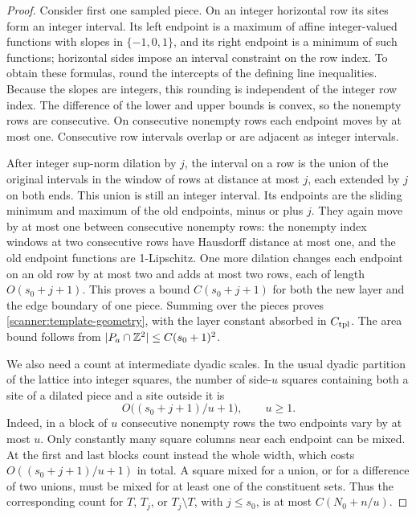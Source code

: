 \begin{proof}
Consider first one sampled piece.  On an integer horizontal row its sites
form an integer interval.  Its left endpoint is a maximum of affine
integer-valued functions with slopes in \(\{-1,0,1\}\), and its right
endpoint is a minimum of such functions; horizontal sides impose an
interval constraint on the row index.  To obtain these formulas, round
the intercepts of the defining line inequalities.  Because the slopes
are integers, this rounding is independent of the integer row index.
The difference of the lower and upper bounds is convex, so the nonempty
rows are consecutive.  On consecutive nonempty rows each endpoint moves
by at most one.  Consecutive row intervals overlap or are adjacent as
integer intervals.

After integer sup-norm dilation by \(j\), the interval on a row is the
union of the original intervals in the window of rows at distance at
most \(j\), each extended by \(j\) on both ends.  This union is still
an integer interval.  Its endpoints are the sliding minimum and maximum
of the old endpoints, minus or plus \(j\).  They again move by at most
one between consecutive nonempty rows: the nonempty index windows at
two consecutive rows have Hausdorff distance at most one, and the old
endpoint functions are 1-Lipschitz.  One more dilation changes each
endpoint on an old row by at most two and adds at most two rows, each
of length \(O(s_0+j+1)\).  This proves a bound
\(C(s_0+j+1)\) for both the new layer and the edge boundary of one
piece.  Summing over the pieces proves
\eqref{scanner:template-geometry}, with the layer constant absorbed in
\(C_{\rm tpl}\).  The area bound follows from
\(|P_a\cap\mathbb Z^2|\le C(s_0+1)^2\).

We also need a count at intermediate dyadic scales.  In the usual dyadic
partition of the lattice into integer squares, the number of side-\(u\)
squares containing both a site of a dilated piece and a site outside it
is
\begin{equation}
 O\bigl((s_0+j+1)/u+1\bigr),\qquad u\ge1.
 \label{scanner:mixed-piece}
\end{equation}
Indeed, in a block of \(u\) consecutive nonempty rows the two endpoints
vary by at most \(u\).  Only constantly many square columns near each
endpoint can be mixed.  At the first and last blocks count instead the
whole width, which costs \(O((s_0+j+1)/u+1)\) in total.
A square mixed for a union, or for a difference of two unions, must be
mixed for at least one of the constituent sets.  Thus the corresponding
count for \(T\), \(T_j\), or \(T_j\setminus T\), with \(j\le s_0\),
is at most
\(C(N_0+n/u)\).


\end{proof}
